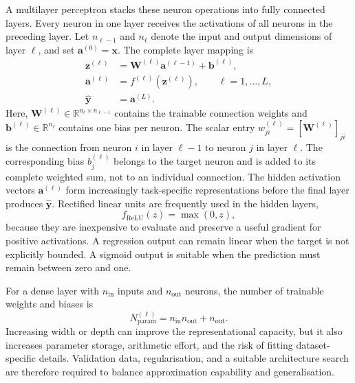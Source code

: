 \documentclass[
    a4paper,
    12pt,
    titlepage,
    bibliography=totoc,
    twoside=on,
    parskip=false,
    numbers=noenddot,
    cleardoublepage=empty,
    DIV=12,
    BCOR=12.0mm,
    headheight=36pt,
    headings=openright
]{scrreprt}
\begin{document}
A multilayer perceptron stacks these neuron operations into fully connected layers. Every neuron in one layer receives the activations of all neurons in the preceding layer. Let $n_{\ell-1}$ and $n_{\ell}$ denote the input and output dimensions of layer $\ell$, and set $\mathbf{a}^{(0)}=\mathbf{x}$. The complete layer mapping is
\begin{equation}
    \begin{aligned}
        \mathbf{z}^{(\ell)}
        &=
        \mathbf{W}^{(\ell)}\mathbf{a}^{(\ell-1)}
        +\mathbf{b}^{(\ell)},\\
        \mathbf{a}^{(\ell)}
        &=
        f^{(\ell)}\!\left(\mathbf{z}^{(\ell)}\right),
        \qquad \ell=1,\ldots,L,\\
        \widehat{\mathbf{y}}
        &=
        \mathbf{a}^{(L)}.
    \end{aligned}
    \label{eq:fundamental_mlp}
\end{equation}
Here, $\mathbf{W}^{(\ell)}\in\mathbb{R}^{n_{\ell}\times n_{\ell-1}}$ contains the trainable connection weights and $\mathbf{b}^{(\ell)}\in\mathbb{R}^{n_{\ell}}$ contains one bias per neuron. The scalar entry $w_{ji}^{(\ell)}=[\mathbf{W}^{(\ell)}]_{ji}$ is the connection from neuron $i$ in layer $\ell-1$ to neuron $j$ in layer $\ell$. The corresponding bias $b_j^{(\ell)}$ belongs to the target neuron and is added to its complete weighted sum, not to an individual connection. The hidden activation vectors $\mathbf{a}^{(\ell)}$ form increasingly task-specific representations before the final layer produces $\widehat{\mathbf{y}}$. Rectified linear units are frequently used in the hidden layers,
\begin{equation}
    f_{\mathrm{ReLU}}(z)=\max(0,z),
    \label{eq:fundamental_relu}
\end{equation}
because they are inexpensive to evaluate and preserve a useful gradient for positive activations. A regression output can remain linear when the target is not explicitly bounded. A sigmoid output is suitable when the prediction must remain between zero and one.

For a dense layer with $n_{\mathrm{in}}$ inputs and $n_{\mathrm{out}}$ neurons, the number of trainable weights and biases is
\begin{equation}
    N_{\mathrm{param}}^{(\ell)}
    =
    n_{\mathrm{in}}n_{\mathrm{out}}+n_{\mathrm{out}}.
    \label{eq:fundamental_dense_parameters}
\end{equation}
Increasing width or depth can improve the representational capacity, but it also increases parameter storage, arithmetic effort, and the risk of fitting dataset-specific details. Validation data, regularisation, and a suitable architecture search are therefore required to balance approximation capability and generalisation.
\end{document}

